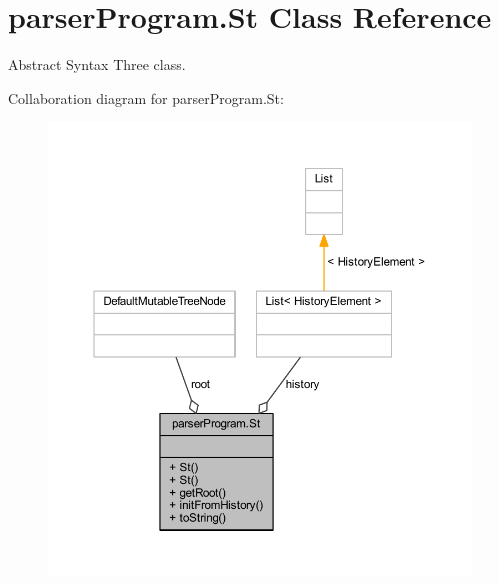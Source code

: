\hypertarget{classparser_program_1_1_st}{\section{parser\-Program.\-St Class Reference}
\label{classparser_program_1_1_st}
}


Abstract Syntax Three class.  




Collaboration diagram for parser\-Program.\-St\-:\nopagebreak
\begin{figure}[H]
\begin{center}
\leavevmode
\includegraphics[width=350pt]{classparser_program_1_1_st__coll__graph}
\end{center}
\end{figure}
